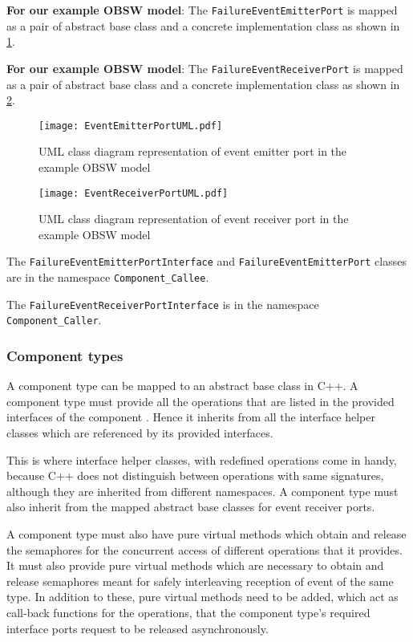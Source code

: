 \textbf{For our example OBSW model}: The \texttt{FailureEvent\allowbreak EmitterPort} is mapped as a pair of abstract base class and a concrete implementation class as shown in \cref{fig: Event emitter port UML}.  

\textbf{For our example OBSW model}: The \texttt{FailureEvent\allowbreak ReceiverPort} is mapped as a pair of abstract base class and a concrete implementation class as shown in \cref{fig: Event receiver port UML}.

\begin{figure}[h]
	\centering
	\texttt{[image: EventEmitterPortUML.pdf]}
	\caption{UML class diagram representation of event emitter port in the example OBSW model}
	\label{fig: Event emitter port UML}
\end{figure}

\begin{figure}[h]
	\centering
	\texttt{[image: EventReceiverPortUML.pdf]}
	\caption{UML class diagram representation of event receiver port in the example OBSW model}
	\label{fig: Event receiver port UML}
\end{figure} 

The \texttt{FailureEvent\allowbreak Emitter\allowbreak Port\allowbreak Interface} and \texttt{FailureEvent\allowbreak Emitter\allowbreak Port} classes are in the namespace \texttt{Component\allowbreak \_Callee}. 

The \texttt{FailureEvent\allowbreak Receiver\allowbreak Port\allowbreak Interface} is in the namespace \texttt{Component\allowbreak\_Caller}.

\subsubsection{\textbf{Component types}}
A component type can be mapped to an abstract base class in C++. A component type must provide all the operations that are listed in the provided interfaces of the component \cite{CompBasedProcess}. Hence it inherits from all the interface helper classes which are referenced by its provided interfaces. 

This is where interface helper classes, with redefined operations come in handy, because C++ does not distinguish between operations with same signatures, although they are inherited from different namespaces. A component type must also inherit from the mapped abstract base classes for event receiver ports.

A component type must also have pure virtual methods which obtain and release the semaphores for the concurrent access of different operations that it provides. It must also provide pure virtual methods which are necessary to obtain and release semaphores meant for safely interleaving reception of event of the same type. In addition to these, pure virtual methods need to be added, which act as call-back functions for the operations, that the component type's required interface ports request to be released asynchronously.   

